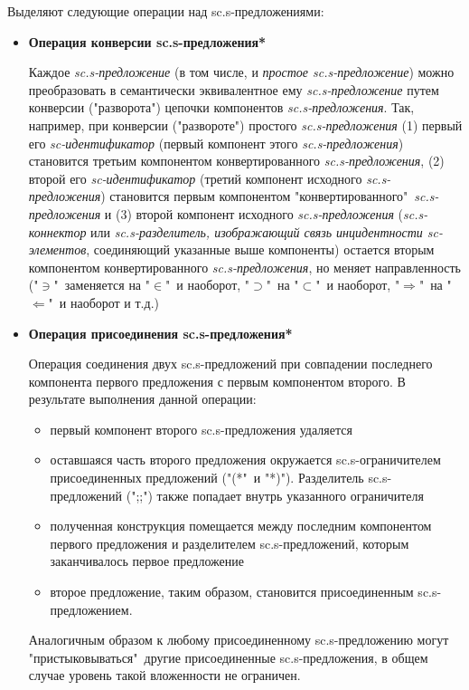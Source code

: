 Выделяют следующие операции над sc.s-предложениями:
\begin{itemize}
	\item{\textbf{Операция конверсии sc.s-предложения*}
		
		Каждое \textit{sc.s-предложение} (в том числе, и \textit{простое sc.s-предложение}) можно преобразовать в семантически эквивалентное ему \textit{sc.s-предложение} путем конверсии ("разворота") цепочки компонентов \textit{sc.s-предложения}. Так, например, при конверсии ("развороте") простого \textit{\mbox{sc.s-предложения}} (1) первый его \textit{\mbox{sc-идентификатор}} (первый компонент этого \textit{\mbox{sc.s-предложения}}) становится третьим компонентом конвертированного\textit{ \mbox{sc.s-предложения}}, (2) второй его \textit{\mbox{sc-идентификатор}} (третий компонент исходного \textit{\mbox{sc.s-предложения}}) становится первым компонентом "конвертированного"\ \textit{\mbox{sc.s-предложения}} и (3) второй компонент исходного \textit{\mbox{sc.s-предложения}} (\textit{\mbox{sc.s-коннектор}} или \textit{\mbox{sc.s-разделитель}, изображающий связь инцидентности \mbox{sc-элементов}}, соединяющий указанные выше компоненты) остается вторым компонентом конвертированного \textit{\mbox{sc.s-предложения}}, но меняет направленность ("$\ni$"\ заменяется на "$\in$"\ и наоборот, "$\supset$"\ на "$\subset$"\ и наоборот, "$\Rightarrow$"\ на "$\Leftarrow$"\ и наоборот и т.д.)}
	\item{\textbf{Операция присоединения sc.s-предложения*}
		
		Операция соединения двух sc.s-предложений при совпадении последнего компонента первого предложения с первым компонентом второго.
		В результате выполнения данной операции:
		\begin{itemize}
			\item первый компонент второго sc.s-предложения удаляется
			\item оставшаяся часть второго предложения окружается sc.s-ограничителем присоединенных предложений ("(*"\ и "*)"). Разделитель sc.s-предложений (";;") также попадает внутрь указанного ограничителя
			\item полученная конструкция помещается между последним компонентом первого предложения и разделителем sc.s-предложений, которым заканчивалось первое предложение
			\item второе предложение, таким образом, становится присоединенным sc.s-предложением.
		\end{itemize}
		Аналогичным образом к любому присоединенному sc.s-предложению могут "пристыковываться"\ другие присоединенные sc.s-предложения, в общем случае уровень такой вложенности не ограничен.
		
}
\end{itemize}
